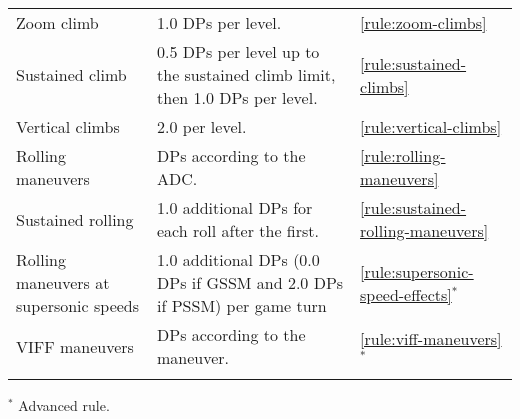 {\begin{twocolumntable}[tp]
\begin{tabularx}{0.9\linewidth}{LLl}
\addlinespace
Zoom climb&1.0 DPs per level.&\mbox{\ref{rule:zoom-climbs}}\\
Sustained climb&0.5 DPs per level up to the sustained climb limit, then 1.0 DPs per level.&\mbox{\ref{rule:sustained-climbs}}\\
Vertical climbs&2.0 per level.&\mbox{\ref{rule:vertical-climbs}}\\
\addlinespace
Rolling maneuvers&DPs according to the ADC.&\mbox{\ref{rule:rolling-maneuvers}}\\
Sustained rolling&1.0 additional DPs for each roll after the first.&\mbox{\ref{rule:sustained-rolling-maneuvers}}\\
Rolling maneuvers at supersonic speeds&1.0 additional DPs (0.0 DPs if GSSM and 2.0 DPs if PSSM) per game turn&\mbox{\ref{rule:supersonic-speed-effects}$^*$}\\
\addlinespace
VIFF maneuvers&DPs according to the maneuver.&\mbox{\ref{rule:viff-maneuvers}$^*$}\\
\addlinespace
\bottomrule
\end{tabularx}
\begin{tablenote}{0.9\linewidth}
$^*$ Advanced rule.
\end{tablenote}

\end{twocolumntable}

}
